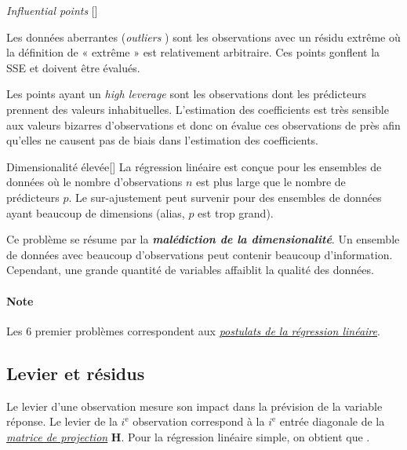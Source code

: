 \documentclass[french]{article}
\begin{document}
\begin{multicols*}{2}
\begin{definitionGENERAL}{\og \textit{Influential points} \fg{}}[]
\bigskip

Les données aberrantes (\og \textit{outliers} \fg{}) sont les observations avec un résidu extrême où la définition de « extrême » est relativement arbitraire. Ces points gonflent la SSE et doivent être évalués.

\bigskip

Les points ayant un \og \textit{high leverage} \fg{} sont les observations dont les prédicteurs prennent des valeurs inhabituelles. L'estimation des coefficients est très sensible aux valeurs bizarres d'observations et donc on évalue ces observations de près afin qu'elles ne causent pas de biais dans l'estimation des coefficients.
\end{definitionGENERAL}

\begin{definitionGENERAL}{\hypertarget{multidimProb}{Dimensionalité élevée}}[]
La régression linéaire est conçue pour les ensembles de données où le nombre d'observations $n$ est plus large que le nombre de prédicteurs $p$. Le sur-ajustement peut survenir pour des ensembles de données ayant beaucoup de dimensions (alias, $p$ est trop grand).

\bigskip

Ce problème se résume par la \textbf{\textit{malédiction de la dimensionalité}}. Un ensemble de données avec beaucoup d'observations peut contenir beaucoup d'information. Cependant, une grande quantité de variables affaiblit la qualité des données.
\end{definitionGENERAL}


\paragraph{Note}	Les 6 premier problèmes correspondent aux \textit{\color{bleudefrance}\underline{\hyperlink{postulatsSLR}{\color{bleudefrance} postulats de la régression linéaire}}}.



\columnbreak
\subsection{Levier et résidus}\label{subsec:LMHLevRes}
\begin{definitionNOHFILL}
Le levier d'une observation mesure son impact dans la prévision de la variable réponse. Le levier de la $i^{\text{e}}$ observation correspond à la $i^{\text{e}}$ entrée diagonale de la \textit{\color{bleudefrance}\underline{\hyperlink{hatMatrix}{\color{bleudefrance} matrice de projection}}} $\bm{H}$. Pour la régression linéaire simple, on obtient que .


\end{definitionNOHFILL}
\end{multicols*}
\end{document}
